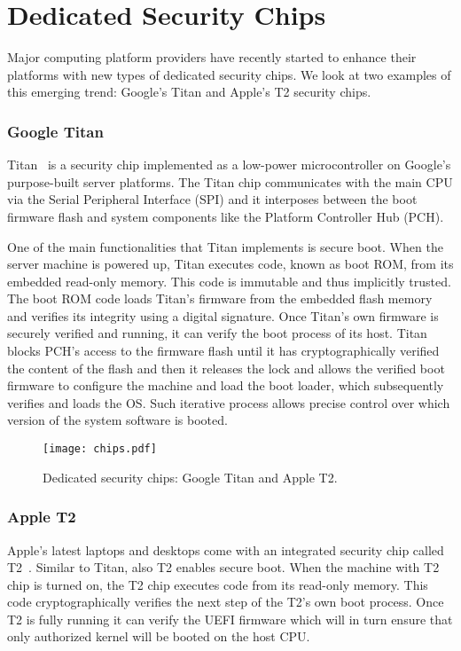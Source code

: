 \section*{Dedicated Security Chips}

Major computing platform providers have recently started to enhance their platforms with new types of dedicated security chips. We look at two examples of this emerging trend: Google’s Titan and Apple’s T2 security chips.

\subsubsection*{Google Titan}

Titan~\cite{titan} is a security chip implemented as a low-power microcontroller on Google’s purpose-built server platforms. The Titan chip communicates with the main CPU via the Serial Peripheral Interface (SPI) and it interposes between the boot firmware flash and system components like the Platform Controller Hub (PCH).

 One of the main functionalities that Titan implements is secure boot. When the server machine is powered up, Titan executes code, known as boot ROM, from its embedded read-only memory. This code is immutable and thus implicitly trusted. The boot ROM code loads Titan’s firmware from the embedded flash memory and verifies its integrity using a digital signature. Once Titan’s own firmware is securely verified and running, it can verify the boot process of its host. Titan blocks PCH’s access to the firmware flash until it has cryptographically verified the content of the flash and then it releases the lock and allows the verified boot firmware to configure the machine and load the boot loader, which subsequently verifies and loads the OS. Such iterative process allows precise control over which version of the system software is booted. 

\begin{figure}[t]
	\centering
	\texttt{[image: chips.pdf]}
	\caption{Dedicated security chips: Google Titan and Apple T2.}
\label{fig:prototype}   
\end{figure}

 
\subsubsection*{Apple T2}
 
 Apple’s latest laptops and desktops come with an integrated security chip called T2~\cite{t2}. Similar to Titan, also T2 enables secure boot. When the machine with T2 chip is turned on, the T2 chip executes code from its read-only memory. This code cryptographically verifies the next step of the T2’s own boot process. Once T2 is fully running it can verify the UEFI firmware which will in turn ensure that only authorized kernel will be booted on the host CPU.

